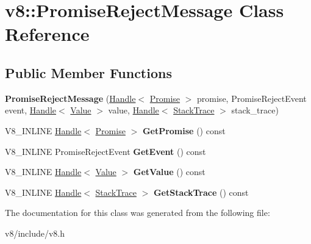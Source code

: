 \hypertarget{classv8_1_1PromiseRejectMessage}{}\section{v8\+:\+:Promise\+Reject\+Message Class Reference}
\label{classv8_1_1PromiseRejectMessage}
\subsection*{Public Member Functions}
\begin{DoxyCompactItemize}
\item 
\hypertarget{classv8_1_1PromiseRejectMessage_adceb7b51206c97c8dc110e455523d7a7}{}{\bfseries Promise\+Reject\+Message} (\hyperlink{classv8_1_1Handle}{Handle}$<$ \hyperlink{classv8_1_1Promise}{Promise} $>$ promise, Promise\+Reject\+Event event, \hyperlink{classv8_1_1Handle}{Handle}$<$ \hyperlink{classv8_1_1Value}{Value} $>$ value, \hyperlink{classv8_1_1Handle}{Handle}$<$ \hyperlink{classv8_1_1StackTrace}{Stack\+Trace} $>$ stack\+\_\+trace)\label{classv8_1_1PromiseRejectMessage_adceb7b51206c97c8dc110e455523d7a7}

\item 
\hypertarget{classv8_1_1PromiseRejectMessage_a4827e57e8e801391fee1fb9ba15219dd}{}V8\+\_\+\+I\+N\+L\+I\+N\+E \hyperlink{classv8_1_1Handle}{Handle}$<$ \hyperlink{classv8_1_1Promise}{Promise} $>$ {\bfseries Get\+Promise} () const \label{classv8_1_1PromiseRejectMessage_a4827e57e8e801391fee1fb9ba15219dd}

\item 
\hypertarget{classv8_1_1PromiseRejectMessage_a1380024500dac27eb74665701a80c6b0}{}V8\+\_\+\+I\+N\+L\+I\+N\+E Promise\+Reject\+Event {\bfseries Get\+Event} () const \label{classv8_1_1PromiseRejectMessage_a1380024500dac27eb74665701a80c6b0}

\item 
\hypertarget{classv8_1_1PromiseRejectMessage_a6460f7a4939dcbaada74edab060fbeca}{}V8\+\_\+\+I\+N\+L\+I\+N\+E \hyperlink{classv8_1_1Handle}{Handle}$<$ \hyperlink{classv8_1_1Value}{Value} $>$ {\bfseries Get\+Value} () const \label{classv8_1_1PromiseRejectMessage_a6460f7a4939dcbaada74edab060fbeca}

\item 
\hypertarget{classv8_1_1PromiseRejectMessage_afe13309811dec50e9de6ca62f05e318e}{}V8\+\_\+\+I\+N\+L\+I\+N\+E \hyperlink{classv8_1_1Handle}{Handle}$<$ \hyperlink{classv8_1_1StackTrace}{Stack\+Trace} $>$ {\bfseries Get\+Stack\+Trace} () const \label{classv8_1_1PromiseRejectMessage_afe13309811dec50e9de6ca62f05e318e}

\end{DoxyCompactItemize}


The documentation for this class was generated from the following file\+:\begin{DoxyCompactItemize}
\item 
v8/include/v8.\+h\end{DoxyCompactItemize}
